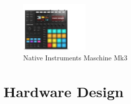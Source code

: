 \documentclass[12pt,a4paper]{report}
\begin{document}
\begin{figure}[h!]
	\begin{center}
		\includegraphics[width = 0.3\textwidth, angle=0, origin=c, trim={0 0 140px 35px}, clip]{maschine.jpg}
		\caption{Native Instruments Maschine Mk3 \cite{maschine}}
		\label{fig:maschine}
	\end{center}
\end{figure}


\chapter{Hardware Design}
\end{document}
